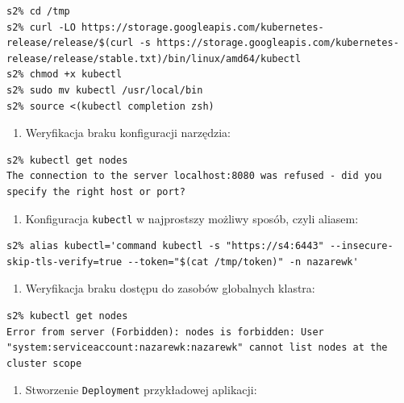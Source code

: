 \documentclass[a4paper,12pt,twoside,openany]{report}
\providecommand{\tightlist}{%
  \setlength{\itemsep}{0pt}\setlength{\parskip}{0pt}}
\newcommand{\passthrough}[1]{#1}
\begin{document}
\begin{lstlisting}
s2% cd /tmp
s2% curl -LO https://storage.googleapis.com/kubernetes-release/release/$(curl -s https://storage.googleapis.com/kubernetes-release/release/stable.txt)/bin/linux/amd64/kubectl
s2% chmod +x kubectl
s2% sudo mv kubectl /usr/local/bin
s2% source <(kubectl completion zsh)
\end{lstlisting}

\begin{enumerate}
\def\labelenumi{\arabic{enumi}.}
\setcounter{enumi}{3}
\tightlist
\item
  Weryfikacja braku konfiguracji narzędzia:
\end{enumerate}

\begin{lstlisting}
s2% kubectl get nodes
The connection to the server localhost:8080 was refused - did you specify the right host or port?
\end{lstlisting}

\begin{enumerate}
\def\labelenumi{\arabic{enumi}.}
\setcounter{enumi}{4}
\tightlist
\item
  Konfiguracja \passthrough{\lstinline!kubectl!} w najprostszy możliwy
  sposób, czyli aliasem:
\end{enumerate}

\begin{lstlisting}
s2% alias kubectl='command kubectl -s "https://s4:6443" --insecure-skip-tls-verify=true --token="$(cat /tmp/token)" -n nazarewk'
\end{lstlisting}

\begin{enumerate}
\def\labelenumi{\arabic{enumi}.}
\setcounter{enumi}{5}
\tightlist
\item
  Weryfikacja braku dostępu do zasobów globalnych klastra:
\end{enumerate}

\begin{lstlisting}
s2% kubectl get nodes
Error from server (Forbidden): nodes is forbidden: User "system:serviceaccount:nazarewk:nazarewk" cannot list nodes at the cluster scope
\end{lstlisting}

\begin{enumerate}
\def\labelenumi{\arabic{enumi}.}
\setcounter{enumi}{6}
\tightlist
\item
  Stworzenie \passthrough{\lstinline!Deployment!} przykładowej
  aplikacji:
\end{enumerate}
\end{document}
